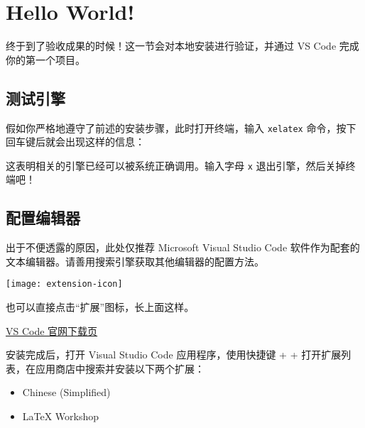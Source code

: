 \section{Hello World!}
\label{sec:hw}

\begin{widepar}
  终于到了验收成果的时候！这一节会对本地安装进行验证，并通过 VS Code 完成你的第一个项目。
\end{widepar}

\subsection{测试引擎}

假如你严格地遵守了前述的安装步骤，此时打开终端，输入 \texttt{xelatex} 命令，按下回车键后就会出现这样的信息：


这表明相关的引擎已经可以被系统正确调用。输入字母 \texttt{x} 退出引擎，然后关掉终端吧！

\subsection{配置编辑器}

出于不便透露的原因，此处仅推荐 Microsoft Visual Studio Code 软件作为配套的文本编辑器。请善用搜索引擎获取其他编辑器的配置方法。

\begin{marginfigure}
\centering
\texttt{[image: extension-icon]}
\caption{也可以直接点击“扩展”图标，长上面这样。}
\end{marginfigure}

\medskip
\href{https://code.visualstudio.com/Download}{\faCloudDownload* VS Code 官网下载页}
\medskip

安装完成后，打开 Visual Studio Code 应用程序，使用快捷键  +  +  打开扩展列表，在应用商店中搜索并安装以下两个扩展：
\begin{itemize}
  \item Chinese (Simplified)
  \item LaTeX Workshop
\end{itemize}

